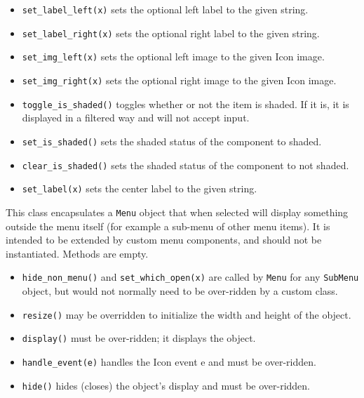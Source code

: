 \begin{itemize}
\item\noindent\texttt{set\_label\_left(x)} sets the optional left label to the given
string.

\item\noindent\texttt{set\_label\_right(x)} sets the optional right label to the given
string.

\item\noindent\texttt{set\_img\_left(x)} sets the optional left image to the given Icon
image.

\item\noindent\texttt{set\_img\_right(x)} sets the optional right image to the given Icon
image.

\item\noindent\texttt{toggle\_is\_shaded()} toggles whether or not the item is shaded. If it
is, it is displayed in a filtered way and will not accept input.

\item\noindent\texttt{set\_is\_shaded()} sets the shaded status of the component to
shaded.

\item\noindent\texttt{clear\_is\_shaded()} sets the shaded status of the component to not
shaded.

\item\noindent\texttt{set\_label(x)} sets the center label to the given string.
\end{itemize}

\medskip{}

This class encapsulates a \texttt{Menu} object that when selected will
display something outside the menu itself (for example a sub-menu of
other menu items). It is intended to be extended by custom menu
components, and should not be instantiated. Methods are empty.

\begin{itemize}
\item\noindent\texttt{hide\_non\_menu()} and \texttt{set\_which\_open(x)} are called
by  \texttt{Menu} for any  \texttt{SubMenu} object,
but would not normally need to be over-ridden by a custom class.

\item\noindent\texttt{resize()} may be overridden to initialize the width and height
of the object.

\item\noindent\texttt{display()} must be over-ridden; it displays the object.

\item\noindent\texttt{handle\_event(e)} handles the Icon event e and must be over-ridden.

\item\noindent\texttt{hide()} hides (closes) the object's display and must be
over-ridden.
\end{itemize}

